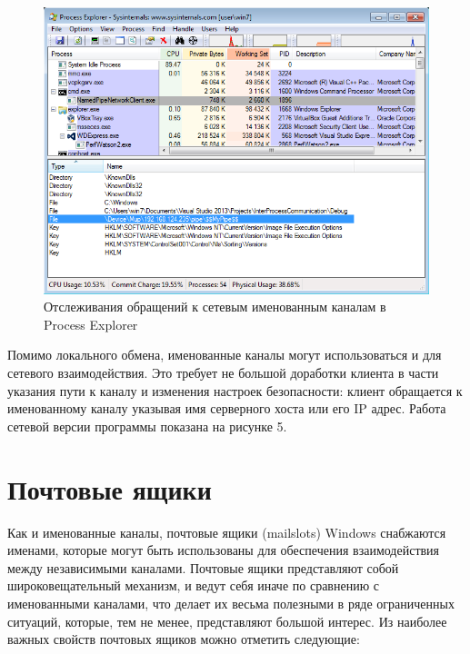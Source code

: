 \documentclass[a4paper, 12pt]{report}		%
\begin{document}
\begin{figure}[h!]
\centering
\includegraphics[scale=0.8]{res/05_Process_Explorer_npn}
\caption{Отслеживания обращений к сетевым именованным каналам в Process Explorer}
\end{figure}

Помимо локального обмена, именованные каналы могут использоваться и для сетевого взаимодействия. Это требует не большой доработки клиента в части указания пути к каналу и изменения настроек безопасности: клиент обращается к именованному каналу указывая имя серверного хоста или его IP адрес. Работа сетевой версии программы показана на рисунке 5. 

\chapter*{Почтовые ящики}

Как и именованные каналы, почтовые ящики (mailslots) Windows снабжаются именами, которые могут быть использованы для обеспечения взаимодействия между независимыми каналами. Почтовые ящики представляют собой широковещательный механизм, и ведут себя иначе по сравнению с именованными каналами, что делает их весьма полезными в ряде ограниченных ситуаций, которые, тем не менее, представляют большой интерес. Из наиболее важных свойств почтовых ящиков можно отметить следующие:
\end{document}
